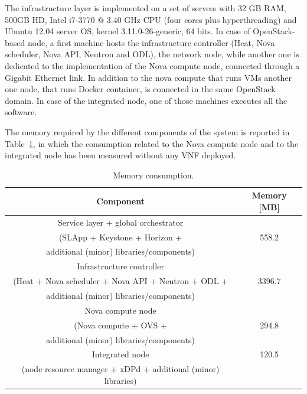 The infrastructure layer is implemented on a set of servers with 32 GB RAM, 500GB HD, Intel i7-3770 @ 3.40 GHz CPU (four cores plus hyperthreading) and Ubuntu 12.04 server OS, kernel 3.11.0-26-generic, 64 bits.
In case of OpenStack-based node, a first machine hosts the infrastructure controller (Heat, Nova scheduler, Nova API, Neutron and ODL), the network node, while another one is dedicated to the implementation of the Nova compute node, connected through a Gigabit Ethernet link. In addition to the nova compute that runs VMs another one node, that runs Docker container, is connected in the same OpenStack domain.
In case of the integrated node, one of those machines executes all the software.

The memory required by the different components of the system is reported in Table~\ref{tab:memory}, in which the consumption related to the Nova compute node and to the integrated node has been measured without any VNF deployed.


\renewcommand{\arraystretch}{1.5}
\begin{table}[htbp]
	\centering
	\tiny
	\caption{Memory consumption.}
	\label{tab:memory}
	\begin{tabular}{c|c}
		\textbf{Component} & \textbf{Memory [MB]} \\
		\hline	
		\hline
		Service layer + global orchestrator & \\
		(SLApp + Keystone + Horizon + & 558.2\\
		additional (minor) libraries/components)  & \\
		\hline
		Infrastructure controller & \\
		(Heat + Nova scheduler + Nova API + Neutron + ODL + & 3396.7\\
		additional (minor) libraries/components) &  \\
		\hline
		Nova compute node & \\
		(Nova compute + OVS +  & 294.8\\
		additional (minor) libraries/components) &  \\
		\hline
		Integrated node & 120.5\\
		(node resource manager + xDPd + additional (minor) libraries) & \\
		\hline 
	\end{tabular}
\end{table}

